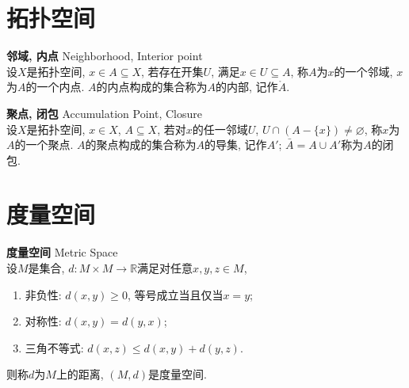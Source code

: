 
\section{拓扑空间}

\begin{dfn} \textbf{邻域, 内点} Neighborhood, Interior point\\
设$X$是拓扑空间, $x\in A\subseteq X$, 若存在开集$U$, 满足$x\in U\subseteq A$, 称$A$为$x$的一个邻域, $x$为$A$的一个内点. $A$的内点构成的集合称为$A$的内部, 记作$\mathring{A}$. 
\end{dfn}

\begin{dfn} \textbf{聚点, 闭包} Accumulation Point, Closure\\
设$X$是拓扑空间, $x\in X$, $A\subseteq X$, 若对$x$的任一邻域$U$, $U\cap (A-\{x\})\neq \varnothing$, 称$x$为$A$的一个聚点. $A$的聚点构成的集合称为$A$的导集, 记作$A'$; $\bar{A}=A\cup A'$称为$A$的闭包. 
\end{dfn}

\section{度量空间}

\begin{dfn} \textbf{度量空间} Metric Space\\
设$M$是集合, $d: M\times M \to \mathbb{R}$满足对任意$x,y,z\in M$, 
\begin{enumerate}
\item 非负性: $d(x,y)\ge 0$, 等号成立当且仅当$x=y$;
\item 对称性: $d(x,y)=d(y,x)$;
\item 三角不等式: $d(x,z)\le d(x,y)+d(y,z)$.
\end{enumerate}
则称$d$为$M$上的距离, $(M,d)$是度量空间. 
\end{dfn}


